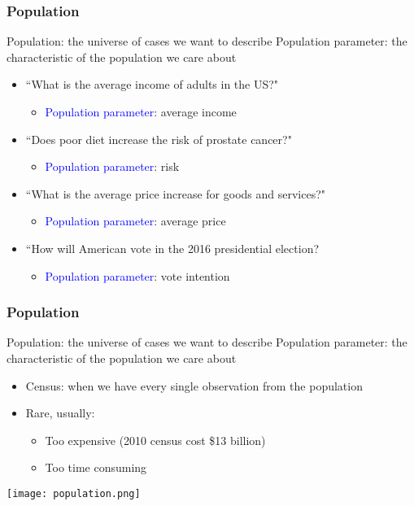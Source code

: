 \documentclass{beamer}
\newcommand{\blue}{\textcolor{blue}}
\begin{document}
\begin{frame}
 \frametitle{Population}
 Population: the \alert{universe of cases} we want to describe
 Population parameter: the characteristic of the population we care about
 \begin{itemize}[<+->]
   \item ``What is the average income of adults in the US?"
      \begin{itemize}
        \item \blue{Population parameter}: average income
      \end{itemize}
   \item ``Does poor diet increase the risk of prostate cancer?"
      \begin{itemize}
        \item \blue{Population parameter}: risk
      \end{itemize}
   \item ``What is the average price increase for goods and services?"
      \begin{itemize}
        \item \blue{Population parameter}: average price
      \end{itemize}
   \item ``How will American vote in the 2016 presidential election?
      \begin{itemize}
        \item \blue{Population parameter}: vote intention
      \end{itemize}
 \end{itemize}
\end{frame}

\begin{frame}
 \frametitle{Population}
 \begin{minipage}{.58\linewidth}
 Population: the \alert{universe of cases} we want to describe
 Population parameter: the characteristic of the population we care about
 \begin{itemize}[<+->]
   \item Census: when we have every single observation from the population
   \item Rare, usually:
      \begin{itemize}
        \item Too expensive (2010 census cost \$13 billion)
        \item Too time consuming
      \end{itemize}
 \end{itemize}
 \end{minipage}\hfill
 \begin{minipage}{.38\linewidth}
 \texttt{[image: population.png]}
 \end{minipage}
\end{frame}
\end{document}
